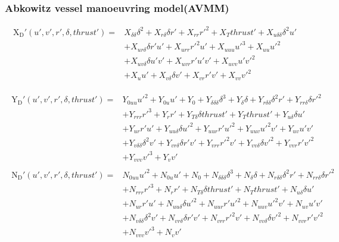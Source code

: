 \subsubsection*{\normalfont \textbf{Abkowitz vessel manoeuvring model(AVMM) \cite{abkowitz_ship_1964}}}
\begin{equation}\label{equation:02.01_manoeuvring models:eqxabkowitz}
\begin{split}
\operatorname{X_{D}'}{\left(u',v',r',\delta,thrust' \right)} = & X_{\delta\delta} \delta^{2} + X_{r\delta} \delta r' + X_{rr} r'^{2} + X_{T} thrust' + X_{u\delta\delta} \delta^{2} u' \\ 
& + X_{ur\delta} \delta r' u' + X_{urr} r'^{2} u' + X_{uuu} u'^{3} + X_{uu} u'^{2} \\ 
& + X_{uv\delta} \delta u' v' + X_{uvr} r' u' v' + X_{uvv} u' v'^{2} \\
& + X_{u} u' + X_{v\delta} \delta v' + X_{vr} r' v' + X_{vv} v'^{2} 
\end{split}
\end{equation}

\begin{equation}\label{equation:02.01_manoeuvring models:eqyabkowitz}
\begin{split}\begin{split}
\operatorname{Y_{D}'}{\left(u',v',r',\delta,thrust' \right)} = & Y_{0uu} u'^{2} + Y_{0u} u' + Y_{0} + Y_{\delta\delta\delta} \delta^{3} + Y_{\delta} \delta + Y_{r\delta\delta} \delta^{2} r' + Y_{rr\delta} \delta r'^{2} \\ & + Y_{rrr} r'^{3} + Y_{r} r' + Y_{T\delta} \delta thrust' + Y_{T} thrust' + Y_{u\delta} \delta u' \\ & + Y_{ur} r' u' + Y_{uu\delta} \delta u'^{2} + Y_{uur} r' u'^{2} + Y_{uuv} u'^{2} v' + Y_{uv} u' v' \\ & + Y_{v\delta\delta} \delta^{2} v' + Y_{vr\delta} \delta r' v' + Y_{vrr} r'^{2} v' + Y_{vv\delta} \delta v'^{2} + Y_{vvr} r' v'^{2} \\ & + Y_{vvv} v'^{3} + Y_{v} v' 
\end{split}\end{split}
\end{equation}\begin{equation}\label{equation:02.01_manoeuvring models:eqnabkowitz}
\begin{split}\begin{split}
\operatorname{N_{D}'}{\left(u',v',r',\delta,thrust' \right)} = & N_{0uu} u'^{2} + N_{0u} u' + N_{0} + N_{\delta\delta\delta} \delta^{3} + N_{\delta} \delta + N_{r\delta\delta} \delta^{2} r' + N_{rr\delta} \delta r'^{2} \\ & + N_{rrr} r'^{3} + N_{r} r' + N_{T\delta} \delta thrust' + N_{T} thrust' + N_{u\delta} \delta u' \\ & + N_{ur} r' u' + N_{uu\delta} \delta u'^{2} + N_{uur} r' u'^{2} + N_{uuv} u'^{2} v' + N_{uv} u' v' \\ & + N_{v\delta\delta} \delta^{2} v' + N_{vr\delta} \delta r' v' + N_{vrr} r'^{2} v' + N_{vv\delta} \delta v'^{2} + N_{vvr} r' v'^{2} \\ & + N_{vvv} v'^{3} + N_{v} v' 
\end{split}\end{split}
\end{equation}
\sphinxAtStartPar
